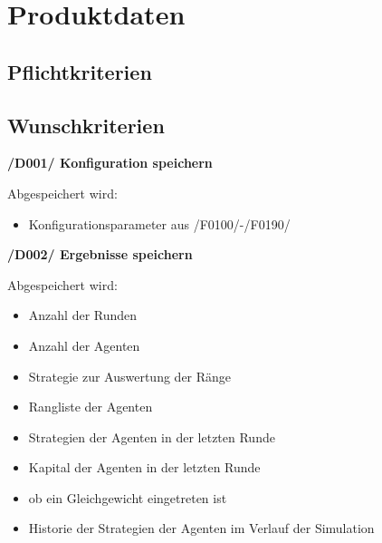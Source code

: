 \section{Produktdaten}

\subsection{Pflichtkriterien}

\subsection{Wunschkriterien}

\textbf{/D001/ Konfiguration speichern}

Abgespeichert wird:
\begin{itemize}
\item Konfigurationsparameter aus /F0100/-/F0190/
\end{itemize}

\textbf{/D002/ Ergebnisse speichern}	

Abgespeichert wird:
\begin{itemize}
\item Anzahl der Runden
\item Anzahl der Agenten
\item Strategie zur Auswertung der Ränge
\item Rangliste der Agenten
\item Strategien der Agenten in der letzten Runde
\item Kapital der Agenten in der letzten Runde
\item ob ein Gleichgewicht eingetreten ist
\item Historie der Strategien der Agenten im Verlauf der Simulation
\end{itemize}